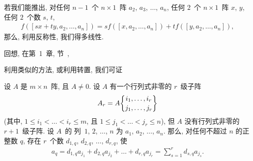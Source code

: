 \documentclass[../libro.tex]{subfiles}
\begin{document}
若我们能推出,
对任何 \(n-1\)~个 \(n \times 1\)~阵
\(a_2\), \(a_3\), \(\dots\), \(a_n\),
任何 \(2\)~个 \(n \times 1\)~阵 \(x\), \(y\),
任何 \(2\)~个数 \(s\), \(t\),
\begin{align*}
    f([sx + ty, a_2, \dots, a_n])
    = s f([x, a_2, \dots, a_n])
    + t f([y, a_2, \dots, a_n]),
\end{align*}
那么, 利用反称性, 我们得多线性.

回想, 在第~1~章, 节~,


利用类似的方法, 或利用转置, 我们可证

\begin{theorem}
    设 \(A\) 是 \(m \times n\)~阵,
    且 \(A \neq 0\).
    设 \(A\) 有一个行列式非零的 \(r\)~级子阵
    \begin{align*}
        A_r = A\submat{i_1,\dots,i_r}{j_1,\dots,j_r}
    \end{align*}
    (其中, %
    \(1 \leq i_1 < \dots < i_r \leq m\),
    且 \(1 \leq j_1 < \dots < j_r \leq n\)), %
    但 \(A\) 没有行列式非零的 \(r+1\)~级子阵.
    设 \(A\)~的%
    列~\(1\), \(2\), \(\dots\), \(n\)
    为 \(a_1\), \(a_2\), \(\dots\), \(a_n\).
    那么, 对任何不超过 \(n\) 的正整数 \(q\),
    存在 \(r\)~个数
    \(d_{1,q}\), \(d_{2,q}\), \(\dots\), \(d_{r,q}\),
    使
    \begin{align*}
        a_q
        = d_{1,q} a_{j_1}
        + d_{2,q} a_{j_2}
        + \dots
        + d_{r,q} a_{j_r}
        = \sum_{s = 1}^{r} {d_{s,q} a_{j_s}}.
    \end{align*}
\end{theorem}
\end{document}
